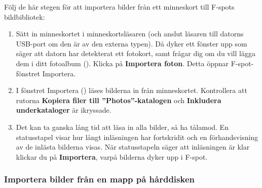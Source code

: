\documentclass[a4paper,final]{memoir} %
\begin{document}
Följ de här stegen för att importera bilder från ett minneskort till F-spots bildbibliotek:

\begin{enumerate}

\item Sätt in minneskortet i minneskortsläsaren (och anslut läsaren till datorns USB-port om den är av den externa typen). Då dyker ett fönster upp som säger att datorn har detekterat ett fotokort, samt frågar dig om du vill lägga dem i ditt fotoalbum (). Klicka på \textbf{Importera foton}. Detta öppnar F-spot-fönstret Importera.


\item I fönstret Importera () läses bilderna in från minneskortet. Kontrollera att rutorna \textbf{Kopiera filer till ''Photos''-katalogen} och \textbf{Inkludera underkataloger} är ikryssade. 


\item Det kan ta ganska lång tid att läsa in alla bilder, så ha tålamod. En statusstapel visar hur långt inläsningen har fortskridit och en förhandsvisning av de inlästa bilderna visas. När statusstapeln säger att inläsningen är klar klickar du på \textbf{Importera}, varpå bilderna dyker upp i F-spot.

\end{enumerate}




\subsubsection{Importera bilder från en mapp på hårddisken}
\end{document}
